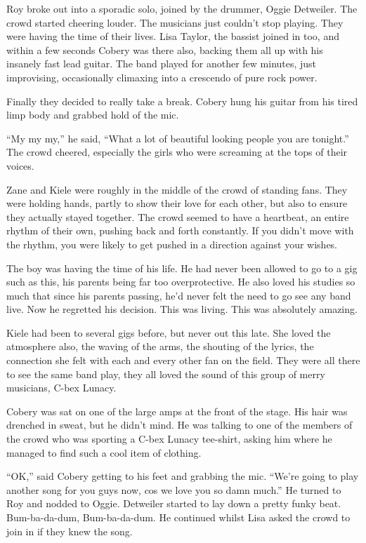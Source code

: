 Roy broke out into a sporadic solo, joined by the drummer, Oggie Detweiler.  The crowd started cheering louder.  The musicians just couldn't stop playing.  They were having the time of their lives.  Lisa Taylor, the bassist joined in too, and within a few seconds Cobery was there also, backing them all up with his insanely fast lead guitar.  The band played for another few minutes, just improvising, occasionally climaxing into a crescendo of pure rock power.  

Finally they decided to really take a break.  Cobery hung his guitar from his tired limp body and grabbed hold of the mic.

``My my my,'' he said, ``What a lot of beautiful looking people you are tonight.''  The crowd cheered, especially the girls who were screaming at the tops of their voices.

Zane and Kiele were roughly in the middle of the crowd of standing fans.  They were holding hands, partly to show their love for each other, but also to ensure they actually stayed together.  The crowd seemed to have a heartbeat, an entire rhythm of their own, pushing back and forth constantly.  If you didn't move with the rhythm, you were likely to get pushed in a direction against your wishes.

The boy was having the time of his life.  He had never been allowed to go to a gig such as this, his parents being far too overprotective.  He also loved his studies so much that since his parents passing, he'd never felt the need to go see any band live.  Now he regretted his decision.  This was living.  This was absolutely amazing.  

Kiele had been to several gigs before, but never out this late.  She loved the atmosphere also, the waving of the arms, the shouting of the lyrics, the connection she felt with each and every other fan on the field.  They were all there to see the same band play, they all loved the sound of this group of merry musicians, C-bex Lunacy.

Cobery was sat on one of the large amps at the front of the stage.  His hair was drenched in sweat, but he didn't mind.  He was talking to one of the members of the crowd who was sporting a C-bex Lunacy tee-shirt, asking him where he managed to find such a cool item of clothing.

``OK,'' said Cobery getting to his feet and grabbing the mic.  ``We're going to play another song for you guys now, cos we love you so damn much.''  He turned to Roy and nodded to Oggie.  Detweiler started to lay down a pretty funky beat.  Bum-ba-da-dum, Bum-ba-da-dum.  He continued whilst Lisa asked the crowd to join in if they knew the song.

